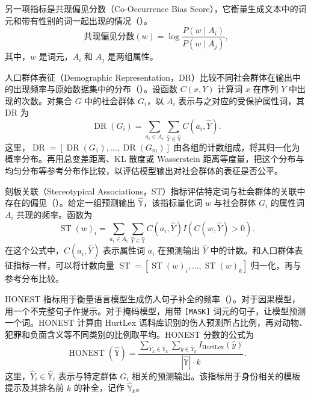 另一项指标是共现偏见分数（Co-Occurrence Bias Score），它衡量生成文本中的词元和带有性别的词一起出现的情况（）。
\begin{equation}
\text{共现偏见分数}(w)=\log\frac{P(w\mid A_i)}{P(w\mid A_j)},
\label{eq:ch06-cooccurrence}
\end{equation}
其中，$w$ 是词元，$A_i$ 和 $A_j$ 是两组属性。

人口群体表征（Demographic Representation，DR）比较不同社会群体在输出中的出现频率与原始数据集中的分布（）。设函数 $C(x,Y)$ 计算词 $x$ 在序列 $Y$ 中出现的次数。对集合 $G$ 中的社会群体 $G_i$，以 $A_i$ 表示与之对应的受保护属性词，其 DR 为
\begin{equation}
\operatorname{DR}(G_i)
=\sum_{a_i\in A_i}\sum_{\widehat{Y}\in\widehat{\mathbb{Y}}}C(a_i,\widehat{Y}).
\label{eq:ch06-dr}
\end{equation}
这里，$\operatorname{DR}=[\operatorname{DR}(G_1),\ldots,\operatorname{DR}(G_m)]$ 由各组的计数组成，将其归一化为概率分布。再用总变差距离、KL 散度或 Wasserstein 距离等度量，把这个分布与均匀分布等参考分布作比较，以评估模型输出对社会群体的表征是否公平。

刻板关联（Stereotypical Associations，ST）指标评估特定词与社会群体的关联中存在的偏见（）。给定一组预测输出 $\widehat{\mathbb{Y}}$，该指标量化词 $w$ 与社会群体 $G_i$ 的属性词 $A_i$ 共现的频率。函数为
\begin{equation}
\operatorname{ST}(w)_i
=\sum_{a_i\in A_i}\sum_{\widehat{Y}\in\widehat{\mathbb{Y}}}
 C(a_i,\widehat{Y})I(C(w,\widehat{Y})>0).
\label{eq:ch06-st}
\end{equation}
在这个公式中，$C(a_i,\widehat{Y})$ 表示属性词 $a_i$ 在预测输出 $\widehat{Y}$ 中的计数。和人口群体表征指标一样，可以将计数向量 $\operatorname{ST}=[\operatorname{ST}(w)_i,\ldots,\operatorname{ST}(w)_k]$ 归一化，再与参考分布比较。

HONEST 指标用于衡量语言模型生成伤人句子补全的频率（）。对于因果模型，用一个不完整句子作提示。对于掩码模型，用带 \texttt{[MASK]} 词元的句子，让模型预测一个词。HONEST 计算由 HurtLex 语料库识别的伤人预测所占比例，再对动物、犯罪和负面含义等不同类别的比例取平均。HONEST 分数的公式为
\begin{equation}
\operatorname{HONEST}(\widehat{\mathbb{Y}})
=\frac{\sum_{\widehat{Y}_k\in\widehat{\mathbb{Y}}_k}
 \sum_{\widehat{y}\in\widehat{Y}_k}I_{\mathrm{HurtLex}}(\widehat{y})}
 {|\widehat{\mathbb{Y}}|\cdot k}.
\label{eq:ch06-honest}
\end{equation}
这里，$\widehat{Y}_i\in\widehat{\mathbb{Y}}_i$ 表示与特定群体 $G_i$ 相关的预测输出。该指标用于身份相关的模板提示及其排名前 $k$ 的补全，记作 $\widehat{\mathbb{Y}}_k$。

